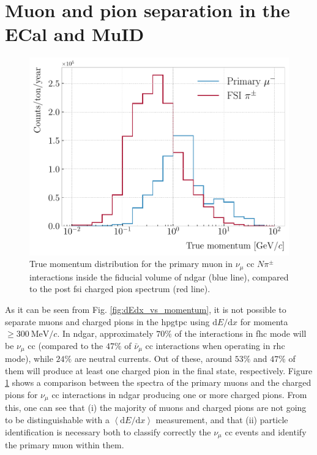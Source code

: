 \section{Muon and pion separation in the ECal and MuID}\label{section:muon_bdt}

\begin{figure}[t]
	\centering
	\includegraphics[width=.70\linewidth]{Images/GArSoft_PID/BDT/ndgar_fhc_numu_cc_mu_spectrum.pdf}
	\caption[True momentum distributions for the primary muon and the post \gls{fsi} charged pions in $\nu_{\mu}$ \gls{cc} $N\pi^{\pm}$ interactions inside \gls{ndgar}.]{True momentum distribution for the primary muon in $\nu_{\mu}$ \gls{cc} $N\pi^{\pm}$ interactions inside the fiducial volume of \gls{ndgar} (blue line), compared to the post \gls{fsi} charged pion spectrum (red line).}
	\label{fig:primary_muon_spectrum}
\end{figure}

As it can be seen from Fig. \ref{fig:dEdx_vs_momentum}, it is not possible to separate muons and charged pions in the \gls{hpgtpc} using $\mathrm{d}E/\mathrm{d}x$ for momenta $\geq 300~\mathrm{MeV}/c$. In \gls{ndgar}, approximately $70\%$ of the interactions in \gls{fhc} mode will be $\nu_{\mu}$ \gls{cc} (compared to the $47\%$ of $\bar{\nu}_{\mu}$ \gls{cc} interactions when operating in \gls{rhc} mode), while $24\%$ are neutral currents. Out of these, around $53\%$ and $47\%$ of them will produce at least one charged pion in the final state, respectively. Figure \ref{fig:primary_muon_spectrum} shows a comparison between the spectra of the primary muons and the charged pions for $\nu_{\mu}$ \gls{cc} interactions in \gls{ndgar} producing one or more charged pions. From this, one can see that (i) the majority of muons and charged pions are not going to be distinguishable with a $\left<\mathrm{d}E/\mathrm{d}x\right>$ measurement, and that (ii) particle identification is necessary both to classify correctly the $\nu_{\mu}$ \gls{cc} events and identify the primary muon within them.


